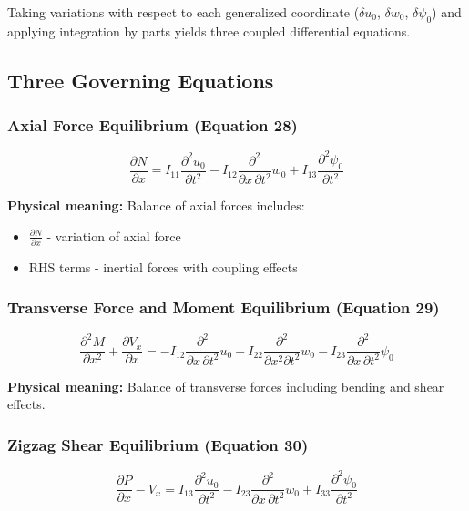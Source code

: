 \documentclass[12pt,a4paper]{article}
\begin{document}
Taking variations with respect to each generalized coordinate ($\delta u_0$, $\delta w_0$, $\delta \psi_0$) and applying integration by parts yields three coupled differential equations.

\subsection{Three Governing Equations}

\subsubsection{Axial Force Equilibrium (Equation 28)}

\begin{equation}
\frac{\partial N}{\partial x}
= I_{11} \frac{\partial^2 u_0}{\partial t^2}
- I_{12} \frac{\partial^2}{\partial x \, \partial t^2} w_0
+ I_{13} \frac{\partial^2 \psi_0}{\partial t^2}
\end{equation}

\textbf{Physical meaning:} Balance of axial forces includes:
\begin{itemize}
\item $\frac{\partial N}{\partial x}$ - variation of axial force
\item RHS terms - inertial forces with coupling effects
\end{itemize}

\subsubsection{Transverse Force and Moment Equilibrium (Equation 29)}

\begin{equation}
\frac{\partial^2 M}{\partial x^2} + \frac{\partial V_x}{\partial x}
= -I_{12} \frac{\partial^2}{\partial x \, \partial t^2} u_0
+ I_{22} \frac{\partial^2}{\partial x^2 \partial t^2} w_0
- I_{23} \frac{\partial^2}{\partial x \, \partial t^2} \psi_0
\end{equation}

\textbf{Physical meaning:} Balance of transverse forces including bending and shear effects.

\subsubsection{Zigzag Shear Equilibrium (Equation 30)}

\begin{equation}
\frac{\partial P}{\partial x} - V_x
= I_{13} \frac{\partial^2 u_0}{\partial t^2}
- I_{23} \frac{\partial^2}{\partial x \, \partial t^2} w_0
+ I_{33} \frac{\partial^2 \psi_0}{\partial t^2}
\end{equation}
\end{document}
